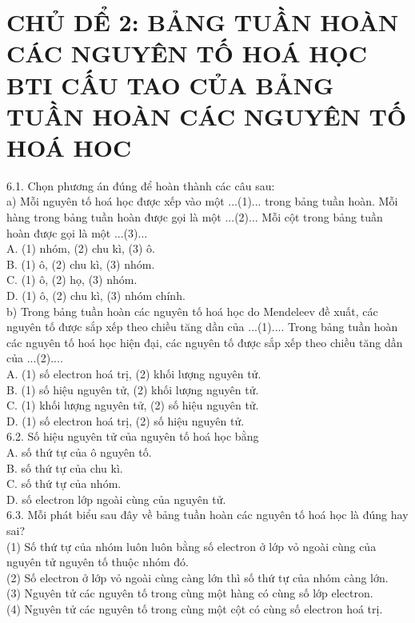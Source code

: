 \documentclass[10pt]{article}
\begin{document}
\section*{CHỦ DỂ 2: BẢNG TUẦN HOÀN CÁC NGUYÊN TỐ HOÁ HỌC \\
 BTI CẤU TAO CỦA BẢNG TUẦN HOÀN CÁC NGUYÊN TỐ HOÁ HOC}
6.1. Chọn phương án đúng để hoàn thành các câu sau:\\
a) Mỗi nguyên tố hoá học được xếp vào một ...(1)... trong bảng tuần hoàn. Mỗi hàng trong bảng tuần hoàn được gọi là một ...(2)... Mỗi cột trong bảng tuần hoàn được gọi là một ...(3)...\\
A. (1) nhóm, (2) chu kì, (3) ô.\\
B. (1) ô, (2) chu kì, (3) nhóm.\\
C. (1) ô, (2) họ, (3) nhóm.\\
D. (1) ô, (2) chu kì, (3) nhóm chính.\\
b) Trong bảng tuần hoàn các nguyên tố hoá học do Mendeleev đề xuất, các nguyên tố được sắp xếp theo chiều tăng dần của ...(1).... Trong bảng tuần hoàn các nguyên tố hoá học hiện đại, các nguyên tố được sắp xếp theo chiều tăng dần của ...(2)....\\
A. (1) số electron hoá trị, (2) khối lượng nguyên tử.\\
B. (1) số hiệu nguyên tử, (2) khối lượng nguyên tử.\\
C. (1) khối lượng nguyên tử, (2) số hiệu nguyên tử.\\
D. (1) số electron hoá trị, (2) số hiệu nguyên tử.\\
6.2. Số hiệu nguyên tử của nguyên tố hoá học bằng\\
A. số thứ tự của ô nguyên tố.\\
B. số thứ tự của chu kì.\\
C. số thứ tự của nhóm.\\
D. số electron lớp ngoài cùng của nguyên tử.\\
6.3. Mỗi phát biểu sau đây về bảng tuần hoàn các nguyên tố hoá học là đúng hay sai?\\
(1) Số thứ tự của nhóm luôn luôn bằng số electron ở lớp vỏ ngoài cùng của nguyên tử nguyên tố thuộc nhóm đó.\\
(2) Số electron ở lớp vỏ ngoài cùng càng lớn thì số thứ tự của nhóm càng lớn.\\
(3) Nguyên tử các nguyên tố trong cùng một hàng có cùng số lớp electron.\\
(4) Nguyên tử các nguyên tố trong cùng một cột có cùng số electron hoá trị.\\
\end{document}
